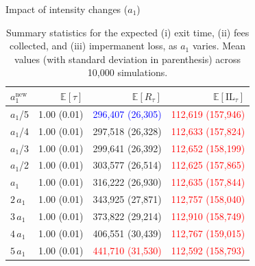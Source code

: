 \documentclass[10pt]{beamer}
\begin{document}
\begin{frame}{Impact of intensity changes ($a_1$)}
\begin{table}[H]
    \centering
    \begin{tabular}{l|rrr}
\hline
\hline
$a_1^{\mathrm{new}}$ & $\mathbb{E}[\tau]$ & $\mathbb{E}[R_\tau]$ & $\mathbb{E}[\mathrm{IL}_\tau]$ \\
\hline
\hline
$a_1$/5 & 1.00 (0.01) & \textcolor{blue}{296,407 (26,305)} & \textcolor{red}{112,619 (157,946)} \\
$a_1$/4 & 1.00 (0.01) & 297,518 (26,328) & \textcolor{red}{112,633 (157,824)} \\
$a_1$/3 & 1.00 (0.01) & 299,641 (26,392) & \textcolor{red}{112,652 (158,199)} \\
$a_1$/2 & 1.00 (0.01) & 303,577 (26,514) & \textcolor{red}{112,625 (157,865)} \\
$a_1$ & 1.00 (0.01) & 316,222 (26,930) & \textcolor{red}{112,635 (157,844)} \\
$2\,a_1$ & 1.00 (0.01) & 343,925 (27,871) & \textcolor{red}{112,757 (158,040)} \\
$3\,a_1$ & 1.00 (0.01) & 373,822 (29,214) & \textcolor{red}{112,910 (158,749)} \\
$4\,a_1$ & 1.00 (0.01) & 406,551 (30,439) & \textcolor{red}{112,767 (159,015)} \\
$5\,a_1$ & 1.00 (0.01) & \textcolor{red}{441,710 (31,530)} & \textcolor{red}{112,592 (158,793)} \\
\hline
\end{tabular}
    \caption{Summary statistics for the expected (i) exit time, (ii) fees collected, and (iii) impermanent loss, as $a_1$ varies. Mean values (with standard deviation in parenthesis) across 10,000 simulations. }
\end{table}
\end{frame}
\end{document}
